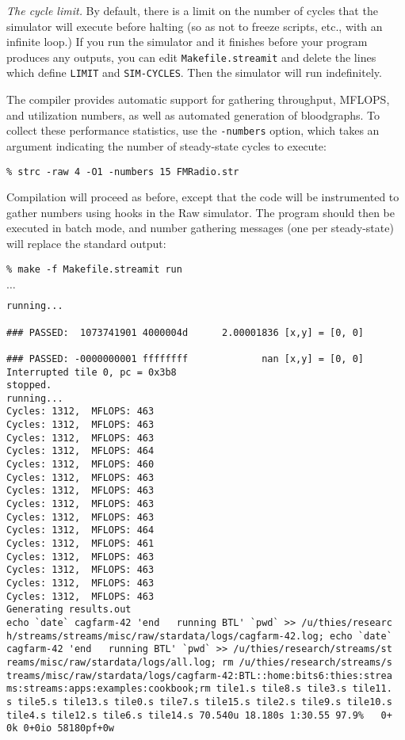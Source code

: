 
{\it The cycle limit.}  By default, there is a limit on the number of
cycles that the simulator will execute before halting (so as not to
freeze scripts, etc., with an infinite loop.)  If you run the
simulator and it finishes before your program produces any outputs,
you can edit {\tt Makefile.streamit} and delete the lines which define
{\tt LIMIT} and {\tt SIM-CYCLES}.  Then the simulator will run
indefinitely.

  The compiler provides automatic
support for gathering throughput, MFLOPS, and utilization numbers, as
well as automated generation of bloodgraphs.  To collect these
performance statistics, use the {\tt -numbers} option, which takes an
argument indicating the number of steady-state cycles to execute:
{\small
\begin{verbatim}
% strc -raw 4 -O1 -numbers 15 FMRadio.str
\end{verbatim}
} 
%
Compilation will proceed as before, except that the code will be
instrumented to gather numbers using hooks in the Raw simulator.  The
program should then be executed in batch mode, and number gathering
messages (one per steady-state) will replace the standard output: 
%
{\small
\begin{verbatim}
% make -f Makefile.streamit run
\end{verbatim}
$\dots$
\begin{verbatim}
running...

### PASSED:  1073741901 4000004d      2.00001836 [x,y] = [0, 0]

### PASSED: -0000000001 ffffffff             nan [x,y] = [0, 0]
Interrupted tile 0, pc = 0x3b8
stopped.
running...
Cycles: 1312,  MFLOPS: 463
Cycles: 1312,  MFLOPS: 463
Cycles: 1312,  MFLOPS: 463
Cycles: 1312,  MFLOPS: 464
Cycles: 1312,  MFLOPS: 460
Cycles: 1312,  MFLOPS: 463
Cycles: 1312,  MFLOPS: 463
Cycles: 1312,  MFLOPS: 463
Cycles: 1312,  MFLOPS: 463
Cycles: 1312,  MFLOPS: 464
Cycles: 1312,  MFLOPS: 461
Cycles: 1312,  MFLOPS: 463
Cycles: 1312,  MFLOPS: 463
Cycles: 1312,  MFLOPS: 463
Cycles: 1312,  MFLOPS: 463
Generating results.out
echo `date` cagfarm-42 'end   running BTL' `pwd` >> /u/thies/researc
h/streams/streams/misc/raw/stardata/logs/cagfarm-42.log; echo `date`
cagfarm-42 'end   running BTL' `pwd` >> /u/thies/research/streams/st
reams/misc/raw/stardata/logs/all.log; rm /u/thies/research/streams/s
treams/misc/raw/stardata/logs/cagfarm-42:BTL::home:bits6:thies:strea
ms:streams:apps:examples:cookbook;rm tile1.s tile8.s tile3.s tile11.
s tile5.s tile13.s tile0.s tile7.s tile15.s tile2.s tile9.s tile10.s
tile4.s tile12.s tile6.s tile14.s 70.540u 18.180s 1:30.55 97.9%   0+
0k 0+0io 58180pf+0w
\end{verbatim}
} 

